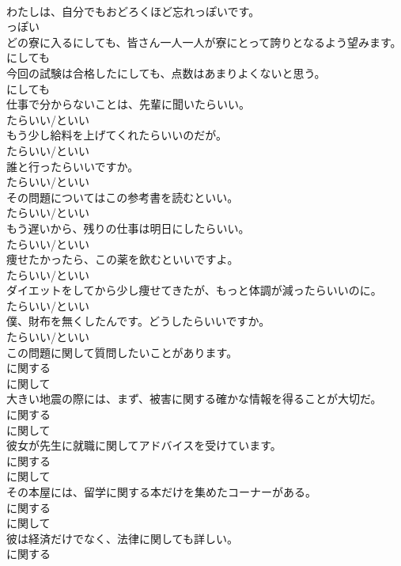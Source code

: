 \documentclass[8pt]{extreport}
\begin{document}
\begin{CJK}{UTF8}{min}
\\	わたしは、自分でもおどろくほど忘れっぽいです。	
\\	っぽい
\\	どの寮に入るにしても、皆さん一人一人が寮にとって誇りとなるよう望みます。	
\\	にしても
\\	今回の試験は合格したにしても、点数はあまりよくないと思う。	
\\	にしても
\\	仕事で分からないことは、先輩に聞いたらいい。	
\\	たらいい/といい
\\	もう少し給料を上げてくれたらいいのだが。	
\\	たらいい/といい
\\	誰と行ったらいいですか。	
\\	たらいい/といい
\\	その問題についてはこの参考書を読むといい。	
\\	たらいい/といい
\\	もう遅いから、残りの仕事は明日にしたらいい。	
\\	たらいい/といい
\\	痩せたかったら、この薬を飲むといいですよ。	
\\	たらいい/といい
\\	ダイエットをしてから少し痩せてきたが、もっと体調が減ったらいいのに。	
\\	たらいい/といい
\\	僕、財布を無くしたんです。どうしたらいいですか。	
\\	たらいい/といい
\\	この問題に関して質問したいことがあります。	
\\	に関する 
\\	に関して
\\	大きい地震の際には、まず、被害に関する確かな情報を得ることが大切だ。	
\\	に関する 
\\	に関して
\\	彼女が先生に就職に関してアドバイスを受けています。	
\\	に関する 
\\	に関して
\\	その本屋には、留学に関する本だけを集めたコーナーがある。	
\\	に関する 
\\	に関して
\\	彼は経済だけでなく、法律に関しても詳しい。	
\\	に関する 

\end{CJK}
\end{document}
